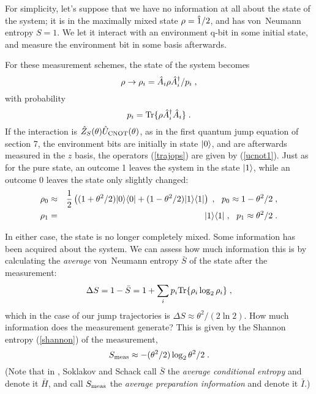 For simplicity, let's suppose that we have no information at all about
the state of the system; it is in the maximally mixed state
$\rho = {\hat 1}/2$, and has von~Neumann entropy $S=1$.
We let it interact with an environment q-bit in some initial state,
and measure the environment bit in some basis afterwards.

For these measurement schemes, the state of the system becomes
\begin{equation}
\rho \rightarrow \rho_i = {\hat A}_i \rho {\hat A^\dagger}_i / p_i \;,
\label{trajops}
\end{equation}
with probability
\begin{equation}
p_i = {\rm Tr}\{\rho{\hat A^\dagger}_i{\hat A}_i\} \;.
\end{equation}
If the interaction is ${\hat Z}_S(\theta){\hat U}_{\rm CNOT}(\theta)$, as in the
first quantum jump equation of section 7, the environment bits are
initially in state ${| 0 \rangle}$, and are afterwards measured in the $z$ basis,
the operators (\ref{trajops}) are given by (\ref{ucnot1}).  Just as
for the pure state, an outcome 1 leaves the system in the state ${| 1 \rangle}$,
while an outcome 0 leaves the state only slightly changed:
\begin{eqnarray}
\rho_0 &\approx& {1\over2}\left( (1+\theta^2/2) \ket0\bra0
  + (1-\theta^2/2) \ket1\bra1 \right) \;,\ \ 
  p_0 \approx 1 - \theta^2/2 \;, \nonumber\\
\rho_1 &=& \ket1\bra1 \;, \ \ p_1 \approx \theta^2/2 \;.
\end{eqnarray}

In either case, the state is no longer completely mixed.  Some information
has been acquired about the system.  We can assess how much information
this is by calculating the {\it average} von~Neumann entropy ${\bar S}$
of the state after the measurement:
\begin{equation}
\Delta S = 1 - {\bar S} = 1 + \sum_i p_i {\rm Tr}\{ \rho_i \log_2 \rho_i \} \;,
\label{deltas}
\end{equation}
which in the case of our jump trajectories is
$\Delta S \approx \theta^2/(2\ln2)$.
How much information does the measurement generate?
This is given by the Shannon entropy (\ref{shannon})
of the measurement,
\begin{equation}
S_{\rm meas} \approx - (\theta^2/2) \log_2\theta^2/2 \;.
\end{equation}
(Note that in \cite{Soklakov}, Soklakov and Schack call ${\bar S}$
the {\it average conditional entropy} and denote it ${\bar H}$,
and call $S_{\rm meas}$ the {\it average preparation information}
and denote it ${\bar I}$.)


